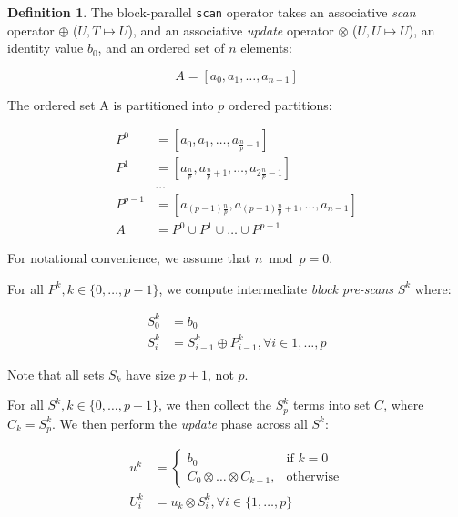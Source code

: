 \documentclass[preprint]{sigplanconf}
\theoremstyle{definition}
\newtheorem{defn}{Definition}
\begin{document}
\begin{defn}
\label{defn:block-parallel-scan}
The block-parallel \texttt{scan} operator takes an associative \emph{scan} operator $\oplus$ ($U, T
\mapsto U$), and an associative \emph{update} operator $\otimes$ ($U, U \mapsto U$), an identity
value $b_0$, and an ordered set of $n$ elements:

$$
A = [a_0, a_1, \ldots, a_{n - 1}]
$$

The ordered set A is partitioned into $p$ ordered partitions:

\begin{equation*}
\begin{split}
P^0 &= [a_0, a_1, \ldots, a_{\frac{n}{p} - 1}] \\
P^1 &= [a_{\frac{n}{p}}, a_{\frac{n}{p} + 1}, \ldots, a_{2\frac{n}{p} - 1}] \\
&\ldots \\
P^{p - 1} &= [a_{(p - 1)\frac{n}{p}}, a_{(p - 1)\frac{n}{p} + 1}, \ldots, a_{n - 1}] \\
A &= P^0 \cup P^1 \cup \ldots \cup P^{p - 1}
\end{split}
\end{equation*}

For notational convenience, we assume that $n \bmod p = 0$.

For all $P^k, k \in \{0, \ldots, p - 1\}$, we compute intermediate \emph{block pre-scans} $S^k$ where:

\begin{equation*}
\begin{split}
S^k_0 &= b_0 \\
S^k_i &= S^k_{i - 1} \oplus P^k_{i - 1}, \forall i \in {1, \ldots, p}
\end{split}
\end{equation*}

Note that all sets $S_k$ have size $p + 1$, not $p$.

For all $S^k, k \in \{0, \ldots, p - 1\}$, we then collect the $S^k_p$ terms into set $C$, where $C_k =
S^k_p$. We then perform the \emph{update} phase across all $S^k$:

\begin{equation*}
\begin{split}
u^k &= \begin{cases}
    b_0& \text{if } k = 0\\
    C_0 \otimes \ldots \otimes C_{k - 1}, & \text{otherwise}
\end{cases} \\
U^k_i &= u_k \otimes S^k_i, \forall i \in \{1, \ldots, p\}
\end{split}
\end{equation*}


\end{defn}
\end{document}
